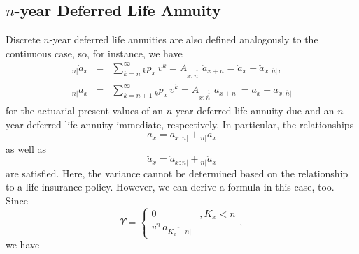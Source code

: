 \documentclass[11pt,fleqn,oneside]{book}
\begin{document}
\subsection*{$n$-year Deferred Life Annuity}
Discrete $n$-year deferred life annuities are also defined analogously to the continuous case, so, for instance, we have 
\begin{eqnarray*}
{_{n|}\ddot{a}_x} &=& \sum_{k=n}^{\infty} {_kp_x}\,v^k = A_{x:\stackrel{1}{\overline{n}|}}\,\ddot{a}_{x+n}
= \ddot{a}_x - \ddot{a}_{x:\overline{n}|},\\
{_{n|}a_x} &=& \sum_{k=n+1}^{\infty} {_kp_x}\,v^k
= A_{x:\stackrel{1}{\overline{n}|}}\,a_{x+n}\
= a_x - a_{x:\overline{n}|}
\end{eqnarray*}
for the actuarial present values of an $n$-year deferred life annuity-due and an $n$-year deferred life annuity-immediate, respectively. In particular, the relationships
$$
a_x =  a_{x:\overline{n}|} + {_{n|}a_x} 
$$
as well as 
$$
\ddot{a}_x = \ddot{a}_{x:\overline{n}|} + {_{n|}\ddot{a}_x} 
$$
are satisfied. Here, the variance cannot be determined based on the relationship to a life insurance policy. However, we can derive a formula in this case, too. Since 
$$
\Upsilon = \left\{\begin{array}{ll}
0 &, K_x<n\\
v^n\,\ddot{a}_{\overline{K_x-n}|}
\end{array}\right.,
$$
we have
\end{document}
